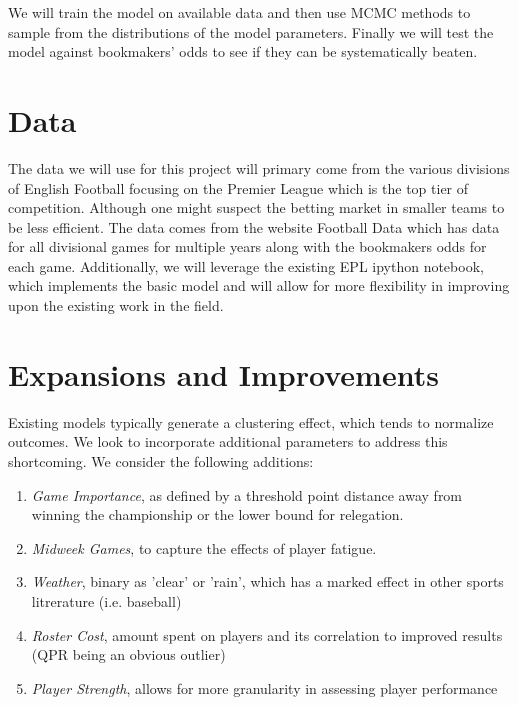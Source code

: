 \documentclass[12pt]{article}
\begin{document}
\par 
We will train the model on available data and then use 
MCMC methods to sample from the distributions of the model parameters. Finally
we will test the model against bookmakers' odds to see if they can be systematically
beaten. 

\section{Data}\label{data}
The data we will use for this project will primary come from the various divisions of
English Football focusing on the Premier League which is the top tier of competition.
Although one might suspect the betting market in smaller teams to be less efficient. 
The data comes from the website Football Data \cite{football-data} which has data for
all divisional games for multiple years along with the bookmakers odds for each game.
Additionally, we will leverage the existing EPL ipython notebook, which implements the basic
model and will allow for more flexibility in improving upon the existing work in the field.
\cite{EPL-notebook}

\section{Expansions and Improvements}\label{expansions and improvements}
Existing models typically generate a clustering effect, which tends to normalize 
outcomes. We look to incorporate additional parameters to address this shortcoming. We 
consider the following additions:

\begin{enumerate}
\item {\em Game Importance}, as defined by a threshold point distance away from 
winning the championship or the lower bound for relegation.

\item {\em Midweek Games}, to capture the effects of player fatigue.

\item {\em Weather}, binary as 'clear' or 'rain', which has a marked effect in other sports 
litrerature (i.e. baseball)

\item {\em Roster Cost}, amount spent on players and its correlation to improved results 
(QPR being an obvious outlier)

\item {\em Player Strength}, allows for more granularity in assessing player performance
\end{enumerate}
\end{document}
